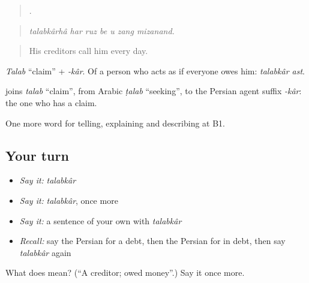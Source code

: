 \begin{quote}
      .
\end{quote}

\begin{quote}
\emph{talabkârhâ har ruz be u zang mizanand.}
\end{quote}

\begin{quote}
His creditors call him every day.
\end{quote}

\emph{Talab} \textquotedblleft{}claim\textquotedblright{} + \emph{-kâr}. Of a person who acts as if everyone owes him: \emph{talabkâr ast}.

\begin{cousinweb}
\textbf{} joins \emph{talab} \textquotedblleft{}claim\textquotedblright{}, from Arabic \emph{ṭalab} \textquotedblleft{}seeking\textquotedblright{}, to the Persian agent suffix \emph{-kâr}: the one who has a claim.
\end{cousinweb}

\begin{grammarlens}[title={What you've built}]
One more word for telling, explaining and describing at B1.
\end{grammarlens}

\subsection*{Your turn}
\begin{itemize}
\raggedright
  \item \emph{Say it:} \emph{talabkâr}
  \item \emph{Say it:} \emph{talabkâr}, once more
  \item \emph{Say it:} a sentence of your own with \emph{talabkâr}
  \item \emph{Recall:} say the Persian for a debt, then the Persian for in debt, then say \emph{talabkâr} again
\end{itemize}

\begin{tcolorbox}[breakable,colback=teal!4,colframe=teal!35!black,title={Before you move on}]
What does  mean? (\textquotedblleft{}A creditor; owed money\textquotedblright{}.) Say it once more.
\end{tcolorbox}
